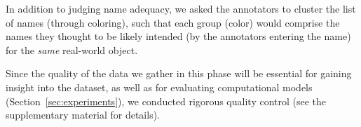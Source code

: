 In addition to judging name adequacy, we asked the annotators to cluster the list of names (through coloring), such that each group (color) would comprise the names they thought to be likely intended (by the \mn annotators entering the name) for the \textit{same} real-world object.

Since the quality of the data we gather in this phase will be essential for gaining insight into the \mn dataset, as well as for evaluating computational models (Section~\ref{sec:experiments}), we conducted rigorous quality control (see the supplementary material for details).



